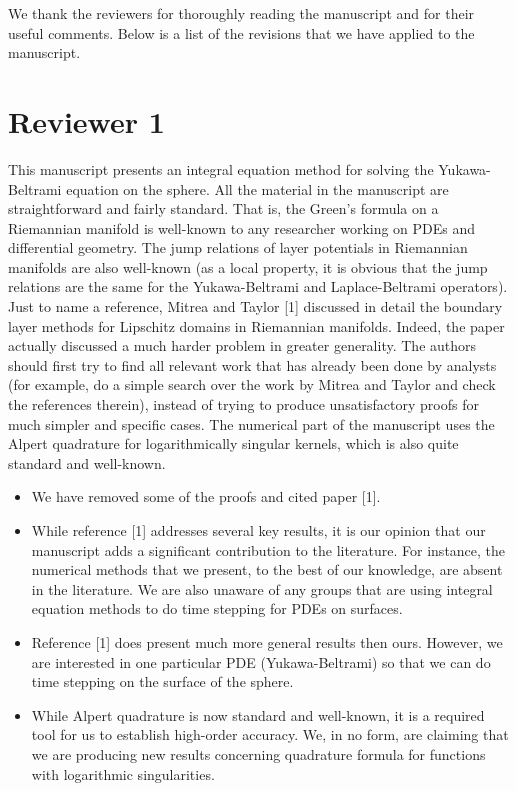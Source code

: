 \documentclass[11pt]{article}
\newcommand{\comment}[1]{{\color{blue} #1}}
\begin{document}
We thank the reviewers for thoroughly reading the manuscript and for
their useful comments.  Below is a list of the revisions that we have
applied to the manuscript.


\section*{Reviewer 1}

\comment{This manuscript presents an integral equation method for
solving the Yukawa-Beltrami equation on the sphere. All the material in
the manuscript are straightforward and fairly standard. That is, the
Green’s formula on a Riemannian manifold is well-known to any
researcher working on PDEs and differential geometry. The jump
relations of layer potentials in Riemannian manifolds are also
well-known (as a local property, it is obvious that the jump relations
are the same for the Yukawa-Beltrami and Laplace-Beltrami operators).
Just to name a reference, Mitrea and Taylor [1] discussed in detail the
boundary layer methods for Lipschitz domains in Riemannian manifolds.
Indeed, the paper actually discussed a much harder problem in greater
generality. The authors should first try to find all relevant work that
has already been done by analysts (for example, do a simple search over
the work by Mitrea and Taylor and check the references therein),
instead of trying to produce unsatisfactory proofs for much simpler and
specific cases. The numerical part of the manuscript uses the Alpert
quadrature for logarithmically singular kernels, which is also quite
standard and well-known.}
\begin{itemize}
  \item We have removed some of the proofs and cited paper [1].
  \item While reference [1] addresses several key results, it is our
  opinion that our manuscript adds a significant contribution to the
  literature.  For instance, the numerical methods that we present, to
  the best of our knowledge, are absent in the literature.  We are also
  unaware of any groups that are using integral equation methods to do
  time stepping for PDEs on surfaces.
  \item Reference [1] does present much more general results then ours.
  However, we are interested in one particular PDE (Yukawa-Beltrami) so
  that we can do time stepping on the surface of the sphere.
  \item While Alpert quadrature is now standard and well-known, it is a
  required tool for us to establish high-order accuracy.  We, in no
  form, are claiming that we are producing new results concerning
  quadrature formula for functions with logarithmic singularities.
 \end{itemize}
\end{document}
